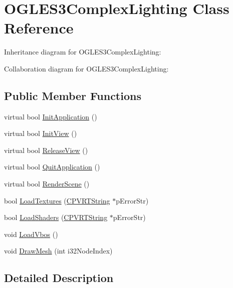 \hypertarget{class_o_g_l_e_s3_complex_lighting}{\section{O\+G\+L\+E\+S3\+Complex\+Lighting Class Reference}
\label{class_o_g_l_e_s3_complex_lighting}
}


Inheritance diagram for O\+G\+L\+E\+S3\+Complex\+Lighting\+:


Collaboration diagram for O\+G\+L\+E\+S3\+Complex\+Lighting\+:
\subsection*{Public Member Functions}
\begin{DoxyCompactItemize}
\item 
virtual bool \hyperlink{class_o_g_l_e_s3_complex_lighting_a3d522e0517241d2de2a207f5cd784e80}{Init\+Application} ()
\item 
virtual bool \hyperlink{class_o_g_l_e_s3_complex_lighting_a2830ae3c5859a11015e39bb9813ece5c}{Init\+View} ()
\item 
virtual bool \hyperlink{class_o_g_l_e_s3_complex_lighting_aea8051ab5786635da7a016cafc2e601c}{Release\+View} ()
\item 
virtual bool \hyperlink{class_o_g_l_e_s3_complex_lighting_a6155f22059606315a72d554b781c944c}{Quit\+Application} ()
\item 
virtual bool \hyperlink{class_o_g_l_e_s3_complex_lighting_a8247d35044742a3d156126ba71ad4f23}{Render\+Scene} ()
\item 
bool \hyperlink{class_o_g_l_e_s3_complex_lighting_a9cf012d94e8d7abe740d76f836363f30}{Load\+Textures} (\hyperlink{class_c_p_v_r_t_string}{C\+P\+V\+R\+T\+String} $\ast$p\+Error\+Str)
\item 
bool \hyperlink{class_o_g_l_e_s3_complex_lighting_ad9f6fe510f36ce8fc2f1266890f6a025}{Load\+Shaders} (\hyperlink{class_c_p_v_r_t_string}{C\+P\+V\+R\+T\+String} $\ast$p\+Error\+Str)
\item 
void \hyperlink{class_o_g_l_e_s3_complex_lighting_a8880a8ab995117f20262b184c908015e}{Load\+Vbos} ()
\item 
void \hyperlink{class_o_g_l_e_s3_complex_lighting_a68a183677bc2317aeb7752fd6f43bc31}{Draw\+Mesh} (int i32\+Node\+Index)
\end{DoxyCompactItemize}


\subsection{Detailed Description}


